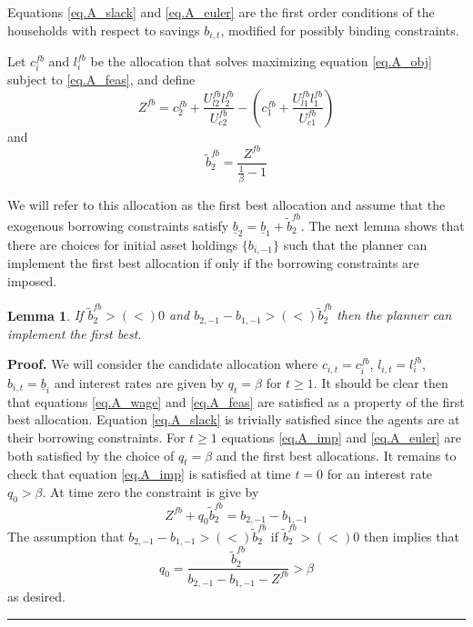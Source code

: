 \documentclass[thmsb,11pt]{article}
\newtheorem{lemma}{Lemma}
\newenvironment{proof}[1][Proof]{\noindent \textbf{#1.} }{\  \rule{0.5em}{0.5em}}
\begin{document}
Equations \eqref{eq.A_slack} and \eqref{eq.A_euler} are the first order conditions of the households with respect to savings $b_{i,t}$, modified for possibly binding constraints.

Let $c^{fb}_i$ and $l^{fb}_i$ be the allocation that solves maximizing equation \eqref{eq.A_obj} subject to \eqref{eq.A_feas}, and define
\begin{equation}
	Z^{fb}  = c_{2}^{fb}+\frac{U_{l2}^{fb}l_{2}^{fb}}{U_{c2}^{fb}}-\left(c_{1}^{fb}+\frac{U_{l1}^{fb}l_{1}^{fb}}{U_{c1}^{fb}}\right)
\end{equation}and
\begin{equation}
	\tilde b_2^{fb} = \frac{Z^{fb}}{\frac1\beta -1}
\end{equation}  


We will refer to this allocation as the first best allocation and assume that the exogenous borrowing constraints satisfy $\underline b_2 = \underline b_1 + \tilde b_2^{fb}$.  The next lemma shows that there are choices for initial asset holdings $\{b_{i,-1}\}$ such that the planner can implement the first best allocation if only if the borrowing constraints are imposed.

\begin{lemma}  If $\tilde b_2^{fb}>(<)0$ and $b_{2,-1}-b_{1,-1} > (<) \tilde b_2^{fb}$ then the planner can implement the first best.
\end{lemma}
\begin{proof}
We will consider the candidate allocation where $c_{i,t} = c^{fb}_i$, $l_{i,t} = l^{fb}_i$, $b_{i,t} = \underline b_i$ and interest rates are given by $q_t = \beta$ for $t\geq 1$.  It should be clear then that equations \eqref{eq.A_wage} and \eqref{eq.A_feas} are satisfied as a property of the first best allocation.  Equation \eqref{eq.A_slack} is trivially satisfied since the agents are at their borrowing constraints.  For $t\geq 1$ equations \eqref{eq.A_imp} and \eqref{eq.A_euler} are both satisfied by the choice of $q_{t} = \beta$ and the first best allocations.  It remains to check that equation \eqref{eq.A_imp} is satisfied at time $t=0$ for an interest rate $q_0 > \beta$.  At time zero the constraint is give by
\begin{equation}
	Z^{fb} + q_0 \tilde b^{fb}_2 = b_{2,-1}-b_{1,-1}
\end{equation}  The assumption that $b_{2,-1}-b_{1,-1} > (<) \tilde b_2^{fb}$ if  $\tilde b_2^{fb}>(<)0$ then implies that
\[
	q_0 = \frac{\tilde b^{fb}_2}{b_{2,-1}-b_{1,-1}- Z^{fb}} >\beta
\] as desired.
\end{proof}
\end{document}
